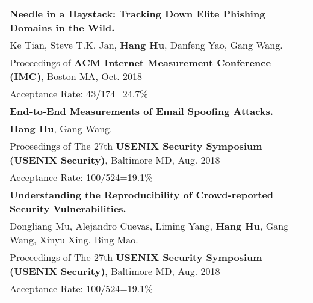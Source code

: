 \documentclass[a4paper,10pt]{article}
\begin{document}
\begin{longtable}{p{17.5cm}}

\textbf{Needle in a Haystack: Tracking Down Elite Phishing Domains in the Wild.}\\
\hspace{1em} Ke Tian, Steve T.K. Jan, \textbf{Hang Hu}, Danfeng Yao, Gang Wang.\\ 
\hspace{1em} Proceedings of \textbf{ACM Internet Measurement Conference (IMC)}, Boston MA, Oct. 2018\\
\hspace{1em} Acceptance Rate: 43/174=24.7\% \\

\textbf{End-to-End Measurements of Email Spoofing Attacks.}\\
\hspace{1em} \textbf{Hang Hu}, Gang Wang.\\ 
\hspace{1em} Proceedings of The 27th \textbf{USENIX Security Symposium (USENIX Security)}, Baltimore MD, Aug. 2018\\
\hspace{1em} Acceptance Rate: 100/524=19.1\% \\

\textbf{Understanding the Reproducibility of Crowd-reported Security Vulnerabilities.}\\
\hspace{1em} Dongliang Mu, Alejandro Cuevas, Liming Yang, \textbf{Hang Hu}, Gang Wang, Xinyu Xing, Bing Mao.\\ 
\hspace{1em} Proceedings of The 27th \textbf{USENIX Security Symposium (USENIX Security)}, Baltimore MD, Aug. 2018\\
\hspace{1em} Acceptance Rate: 100/524=19.1\% \\


\end{longtable}
\end{document}
